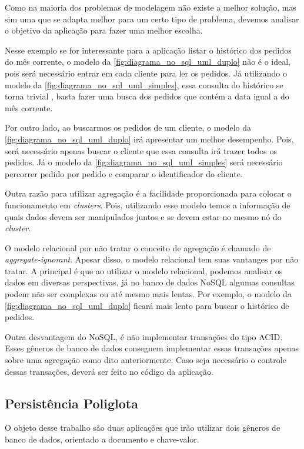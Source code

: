 Como na maioria dos problemas de modelagem não existe a melhor solução, mas sim uma que se adapta melhor para um certo tipo de problema, devemos analisar o objetivo da aplicação para fazer uma melhor escolha.

Nesse exemplo se for interessante para a aplicação listar o histórico dos pedidos do mês corrente, o modelo da \autoref{fig:diagrama_no_sql_uml_duplo} não é o ideal, pois será necessário entrar em cada cliente para ler os pedidos. Já utilizando o modelo da \autoref{fig:diagrama_no_sql_uml_simples}, essa consulta do histórico se torna trivial \cite{NoSQL}, basta fazer uma busca dos pedidos que contém a data igual a do mês corrente.

Por outro lado, ao buscarmos os pedidos de um cliente, o modelo da \autoref{fig:diagrama_no_sql_uml_duplo} irá apresentar um melhor desempenho. Pois, será necessário apenas buscar o cliente que essa consulta irá trazer todos os pedidos. Já o modelo da \autoref{fig:diagrama_no_sql_uml_simples} será necessário percorrer pedido por pedido e comparar o identificador do cliente.

Outra razão para utilizar agregação é a facilidade proporcionada para colocar o funcionamento em \textit{clusters}. Pois, utilizando esse modelo temos a informação de quais dados devem ser manipulados juntos e se devem estar no mesmo nó do \textit{cluster}.

O modelo relacional por não tratar o conceito de agregação é chamado de \textit{aggregate-ignorant}. Apesar disso, o modelo relacional tem suas vantanges por não tratar. A principal é que ao utilizar o modelo relacional, podemos analisar os dados em diversas perspectivas, já no banco de dados NoSQL algumas consultas podem não ser complexas ou até mesmo mais lentas. Por exemplo, o modelo da \autoref{fig:diagrama_no_sql_uml_duplo} ficará mais lento para buscar o histórico de pedidos.

Outra desvantagem do NoSQL, é não implementar transações do tipo \ac{ACID}. Esses gêneros de banco de dados conseguem implementar essas transações apenas sobre uma agregação como dito anteriormente. Caso seja necessário o controle dessas transações, deverá ser feito no código da aplicação.

\subsection{Persistência Poliglota}
\label{subsec:polyglotpersitence}

O objeto desse trabalho são duas aplicações que irão utilizar dois gêneros de banco de dados, orientado a documento e chave-valor.

